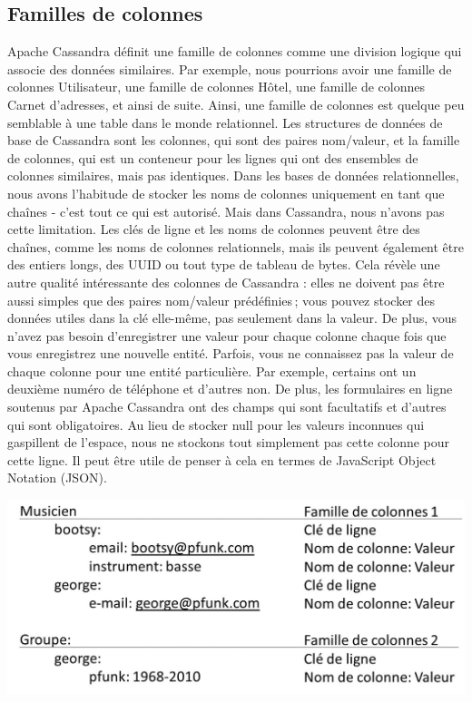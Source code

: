 \documentclass[12pt, letterpaper]{report}
\begin{document}
\subsection{Familles de colonnes }
Apache Cassandra définit une famille de colonnes comme une division logique qui associe des données similaires. Par exemple, nous pourrions avoir une famille de colonnes Utilisateur, une famille de colonnes Hôtel, une famille de colonnes Carnet d'adresses, et ainsi de suite. Ainsi, une famille de colonnes est quelque peu semblable à une table dans le monde relationnel. Les structures de données de base de Cassandra sont les colonnes, qui sont des paires nom/valeur, et la famille de colonnes, qui est un conteneur pour les lignes qui ont des ensembles de colonnes similaires, mais pas identiques. 
\newline
Dans les bases de données relationnelles, nous avons l'habitude de stocker les noms de colonnes uniquement en tant que chaînes - c'est tout ce qui est autorisé. Mais dans Cassandra, nous n'avons pas cette limitation. Les clés de ligne et les noms de colonnes peuvent être des chaînes, comme les noms de colonnes relationnels, mais ils peuvent également être des entiers longs, des UUID ou tout type de tableau de bytes. Cela révèle une autre qualité intéressante des colonnes de Cassandra : elles ne doivent pas être aussi simples que des paires nom/valeur prédéfinies ; vous pouvez stocker des données utiles dans la clé elle-même, pas seulement dans la valeur. 
\newline
De plus, vous n'avez pas besoin d'enregistrer une valeur pour chaque colonne chaque fois que vous enregistrez une nouvelle entité. Parfois, vous ne connaissez pas la valeur de chaque colonne pour une entité particulière. Par exemple, certains ont un deuxième numéro de téléphone et d'autres non. De plus, les formulaires en ligne soutenus par Apache Cassandra ont des champs qui sont facultatifs et d'autres qui sont obligatoires. Au lieu de stocker null pour les valeurs inconnues qui gaspillent de l'espace, nous ne stockons tout simplement pas cette colonne pour cette ligne.
\newline
Il peut être utile de penser à cela en termes de JavaScript Object Notation (JSON). 


\begin{center}
	\includegraphics[width=\textwidth]{json}
\end{center}
\end{document}
